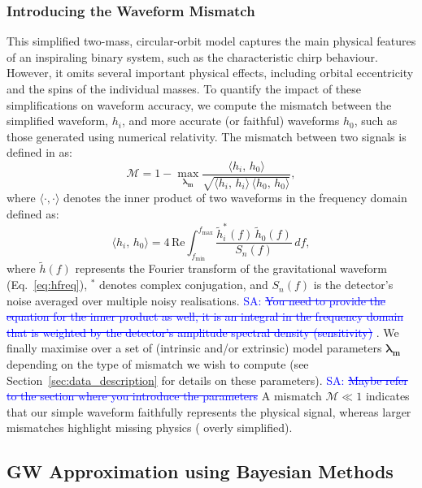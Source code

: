 \documentclass[12pt]{article}
\newcommand{\Sarp}[1]{{\textcolor{blue}{{SA: #1}} }}
\begin{document}
\subsubsection{Introducing the Waveform Mismatch}
\label{subsec:mismatch_intro}
%
%
This simplified two-mass, circular-orbit model captures the main physical features of an inspiraling binary system, such as the characteristic chirp behaviour.
However, it omits several important physical effects, including orbital eccentricity and the spins of the individual masses. 
To quantify the impact of these simplifications on waveform accuracy, we compute the mismatch between the simplified waveform, 
\( h_i \), and more accurate (or faithful) waveforms \( h_0 \), such as those generated using numerical relativity.
The mismatch between two signals is defined in \cite{mismatch, Ogpaper} as:
%
\begin{equation}
\label{eq:mismatch_def}
\mathcal{M} = 1 - \max_{\boldsymbol{\lambda_m}}
\frac{\langle h_i,\,h_0 \rangle}{\sqrt{\langle h_i,\,h_i \rangle \,\langle h_0,\,h_0 \rangle}},
\end{equation}
%
where \( \langle \cdot, \cdot \rangle \) denotes the inner product of two waveforms in the frequency domain defined as:
%
\begin{equation}
\langle h_i,\,h_0 \rangle = 4\,\mathrm{Re} \int_{f_{\text{min}}}^{f_{\text{max}}} \frac{\tilde{h}_i^*(f)\,\tilde{h}_0(f)}{S_n(f)}\,df,
\end{equation}
%
where \( \tilde{h}(f) \) represents the Fourier transform of the gravitational waveform (Eq.~\eqref{eq:hfreq}), \( ^* \) denotes complex conjugation, and \( S_n(f) \) is the detector’s noise averaged over multiple noisy realisations.
\Sarp{\sout{You need to provide the equation for the inner product as well, it is an integral in the frequency domain that
is weighted by the detector's amplitude spectral density (sensitivity)}}.
We finally maximise over a set of (intrinsic and/or extrinsic) model parameters \(\mathbf{\lambda_m}\) depending on the type of mismatch we wish to compute
 (see Section~\ref{sec:data_description} for details on these parameters).
\Sarp{\sout{Maybe refer to the section where you introduce the parameters}}
A mismatch \(\mathcal{M}\ll 1\) indicates that our simple waveform
faithfully represents the physical signal, whereas larger mismatches highlight missing
physics ( overly simplified).




\subsection{GW Approximation using Bayesian Methods}
\label{sec:GW_and_Bayes}
\end{document}
